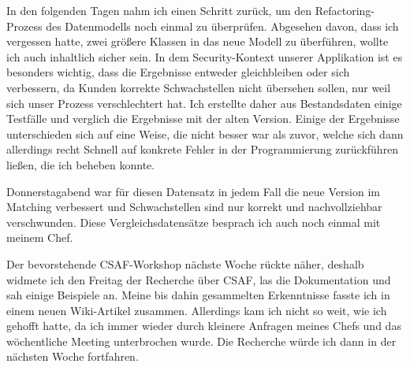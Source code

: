 
In den folgenden Tagen nahm ich einen Schritt zurück, um den Refactoring-Prozess des Datenmodells noch einmal zu überprüfen.
Abgesehen davon, dass ich vergessen hatte, zwei größere Klassen in das neue Modell zu überführen, wollte ich auch inhaltlich sicher sein.
In dem Security-Kontext unserer Applikation ist es besonders wichtig, dass die Ergebnisse entweder gleichbleiben oder sich verbessern, da Kunden korrekte Schwachstellen nicht übersehen sollen, nur weil sich unser Prozess verschlechtert hat.
Ich erstellte daher aus Bestandsdaten einige Testfälle und verglich die Ergebnisse mit der alten Version.
Einige der Ergebnisse unterschieden sich auf eine Weise, die nicht besser war als zuvor, welche sich dann allerdings recht Schnell auf konkrete Fehler in der Programmierung zurückführen ließen, die ich beheben konnte.

Donnerstagabend war für diesen Datensatz in jedem Fall die neue Version im Matching verbessert und Schwachstellen sind nur korrekt und nachvollziehbar verschwunden.
Diese Vergleichsdatensätze besprach ich auch noch einmal mit meinem Chef.


Der bevorstehende CSAF-Workshop nächste Woche rückte näher, deshalb widmete ich den Freitag der Recherche über CSAF, las die Dokumentation und sah einige Beispiele an.
Meine bis dahin gesammelten Erkenntnisse fasste ich in einem neuen Wiki-Artikel zusammen.
Allerdings kam ich nicht so weit, wie ich gehofft hatte, da ich immer wieder durch kleinere Anfragen meines Chefs und das wöchentliche Meeting unterbrochen wurde.
Die Recherche würde ich dann in der nächsten Woche fortfahren.
